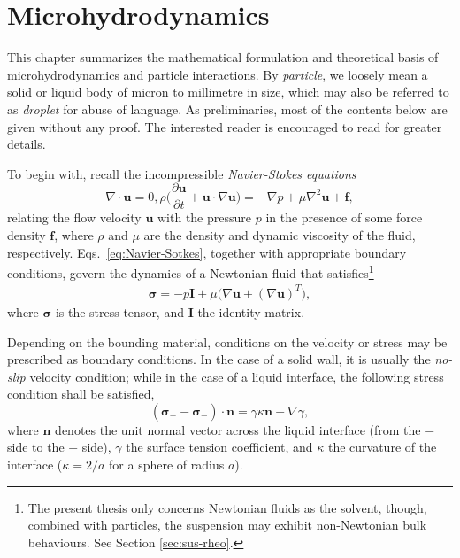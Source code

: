 \chapter{Microhydrodynamics}


This chapter summarizes the mathematical formulation and theoretical basis of microhydrodynamics and particle interactions.
By \emph{particle}, we loosely mean a solid or liquid body of micron to millimetre in size, which may also be referred to as \emph{droplet} for abuse of language.
As preliminaries, most of the contents below are given without any proof. The interested reader is encouraged to read \cite{Batchelor, hb, ps, kim_karrila, graham_2018} for greater details.

\bigskip

To begin with, recall the incompressible \emph{Navier-Stokes equations}
\begin{subequations} \label{eq:Navier-Sotkes}
 \begin{equation}
   \nabla \cdot {\bm u} = 0,
  \label{eq:div-free}
 \end{equation}
 \begin{equation}
   \rho \bigg(\frac{\partial {\bm u}}{\partial t} + {\bm u} \cdot \nabla {\bm u} \bigg) = -\nabla p + \mu \nabla ^2  {\bm u} + {\bm f},
  \label{eq:NS}
 \end{equation}
\end{subequations}
relating the flow velocity $\bm u$ with the pressure $p$ in the presence of some force density $\bm f$, where $\rho$ and $\mu$ are the density and dynamic viscosity of the fluid, respectively.
Eqs.\ \eqref{eq:Navier-Sotkes}, together with appropriate boundary conditions, govern the dynamics of a Newtonian fluid that satisfies\footnote{The present thesis only concerns Newtonian fluids as the solvent, though, combined with particles, the suspension may exhibit non-Newtonian bulk behaviours. See Section \ref{sec:sus-rheo}.}
\begin{equation}
 \begin{aligned}
   {\bm \sigma} = -p {\bm I}+ \mu \bigg( \nabla {\bm u} + (\nabla {\bm u})^T \bigg),
 \end{aligned}
\end{equation}
where $\bm \sigma$ is the stress tensor, and $\bm I$ the identity matrix.

Depending on the bounding material, conditions on the velocity or stress may be prescribed as boundary conditions. In the case of a solid wall, it is usually the \emph{no-slip} velocity condition; while in the case of a liquid interface, the following stress condition shall be satisfied,
\begin{equation} \label{eq:stress-bc}
  ({\bm \sigma}_+ - {\bm \sigma}_- ) \cdot {\bm n} = \gamma \kappa {\bm n} - \nabla \gamma,
\end{equation}
where $\bm n$ denotes the unit normal vector across the liquid interface (from the $-$ side to the $+$ side), $\gamma$ the surface tension coefficient, and $\kappa$ the curvature of the interface (\eg $\kappa=2/a$ for a sphere of radius $a$). 

